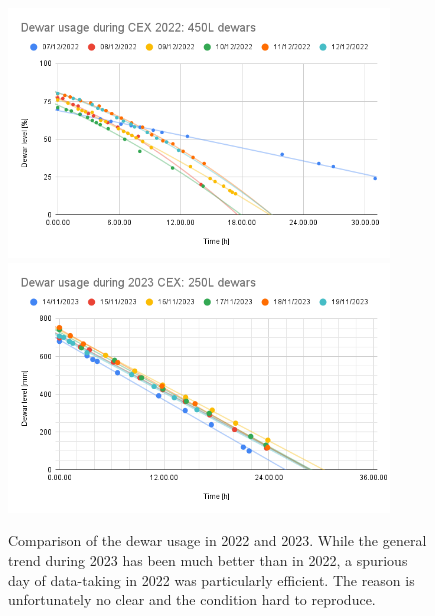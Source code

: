 \begin{refsection}
        \begin{figure}
            \centering
            \includegraphics[width=0.9\textwidth, keepaspectratio]{Figures/LH2/2022/CEX2022_dewars.png}
            \includegraphics[width=0.9\textwidth, keepaspectratio]{Figures/LH2/2023/2023CEX_dewars.png}
            \caption[CEX: Dewar usage in 2022 and 2023.]{Comparison of the dewar usage in 2022 and 2023. While the general trend during 2023 has been much better than in 2022, a spurious day of data-taking in 2022 was particularly efficient. The reason is unfortunately no clear and the condition hard to reproduce.}
            \label{fig:CEX:dewar}
        \end{figure}


\end{refsection}
